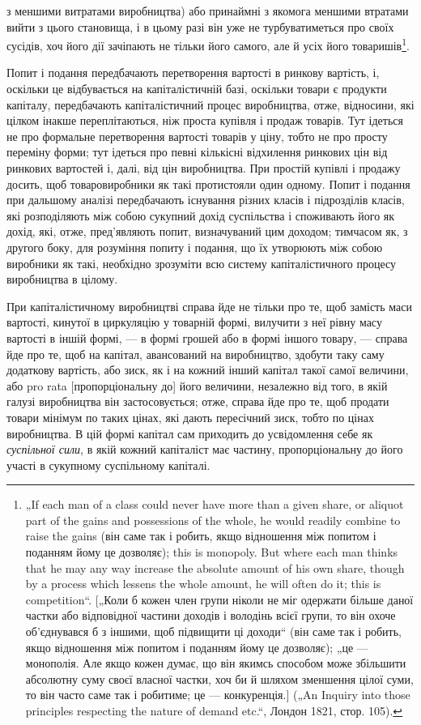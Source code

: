 \parcont{}  %
з меншими витратами виробництва) або принаймні з якомога меншими
втратами вийти з цього становища, і в цьому разі він уже не
турбуватиметься про своїх сусідів, хоч його дії зачіпають не тільки
його самого, але й усіх його товаришів\footnote{
„If each man of a class could never have more than a given share, or
aliquot part of the gains and possessions of the whole, he would readily combine
to raise the gains (він саме так і робить, якщо відношення між попитом і поданням
йому це дозволяє); this is monopoly. But where each man thinks that he
may any way increase the absolute amount of his own share, though by a process
which lessens the whole amount, he will often do it; this is competition“. [„Коли б
кожен член групи ніколи не міг одержати більше даної частки або відповідної
частини доходів і володінь всієї групи, то він охоче об’єднувався б з іншими,
щоб підвищити ці доходи“ (він саме так і робить, якщо відношення між попитом
і поданням йому це дозволяє); „це — монополія. Але якщо кожен думає,
що він якимсь способом може збільшити абсолютну суму своєї власної частки,
хоч би й шляхом зменшення цілої суми, то він часто саме так і робитиме; це —
конкуренція.] („An Inquiry into those principles respecting the nature of demand
etc.“, Лондон 1821, стор. 105).
}.

Попит і подання передбачають перетворення вартості в ринкову
вартість, і, оскільки це відбувається на капіталістичній
базі, оскільки товари є продукти капіталу, передбачають капіталістичний
процес виробництва, отже, відносини, які цілком інакше
переплітаються, ніж проста купівля і продаж товарів. Тут ідеться
не про формальне перетворення вартості товарів у ціну, тобто
не про просту переміну форми; тут ідеться про певні кількісні
відхилення ринкових цін від ринкових вартостей і, далі, від цін виробництва.
При простій купівлі і продажу досить, щоб товаровиробники
як такі протистояли один одному. Попит і подання при
дальшому аналізі передбачають існування різних класів і підрозділів
класів, які розподіляють між собою сукупний дохід суспільства
і споживають його як дохід, які, отже, пред’являють попит, визначуваний
цим доходом; тимчасом як, з другого боку, для розуміння
попиту і подання, що їх утворюють між собою виробники
як такі, необхідно зрозуміти всю систему капіталістичного
процесу виробництва в цілому.

При капіталістичному виробництві справа йде не тільки про те,
щоб замість маси вартості, кинутої в циркуляцію у товарній
формі, вилучити з неї рівну масу вартості в іншій формі, —
в формі грошей або в формі іншого товару, — справа йде про те,
щоб на капітал, авансований на виробництво, здобути таку саму
додаткову вартість, або зиск, як і на кожний інший капітал такої
самої величини, або pro rata [пропорціональну до] його величини,
незалежно від того, в якій галузі виробництва він застосовується;
отже, справа йде про те, щоб продати товари мінімум
по таких цінах, які дають пересічний зиск, тобто по цінах виробництва.
В цій формі капітал сам приходить до усвідомлення
себе як \emph{суспільної сили}, в якій кожний капіталіст має частину,
пропорціональну до його участі в сукупному суспільному капіталі.

